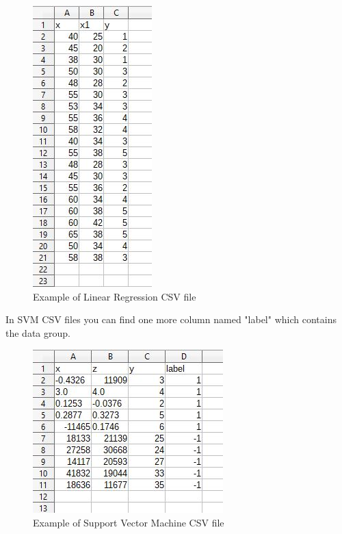 \begin{figure}[H]
		\centering
		\includegraphics[scale=0.70]{../Developer_manual/img/linear_regression_csv.JPG}
		\caption{Example of Linear Regression CSV file}
	\end{figure}

In SVM CSV files you can find one more column named "label" which contains the data group. 

\begin{figure}[H]
		\centering
		\includegraphics[scale=0.70]{../Developer_manual/img/support_vector_machine_csv.JPG}
		\caption{Example of Support Vector Machine CSV file}
	\end{figure}
 



